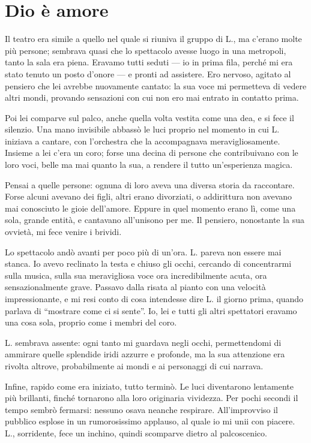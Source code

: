 \chapter{Dio è amore}
\label{ch:dio-e-amore}

Il teatro era simile a quello nel quale si riuniva il gruppo di L., ma c'erano molte più persone;
sembrava quasi che lo spettacolo avesse luogo in una metropoli, tanto la sala era piena. Eravamo
tutti seduti --- io in prima fila, perché mi era stato tenuto un posto d'onore --- e pronti ad
assistere. Ero nervoso, agitato al pensiero che lei avrebbe nuovamente cantato: la sua voce mi
permetteva di vedere altri mondi, provando sensazioni con cui non ero mai entrato in contatto prima.

Poi lei comparve sul palco, anche quella volta vestita come una dea, e si fece il silenzio. Una mano
invisibile abbassò le luci proprio nel momento in cui L. iniziava a cantare, con l'orchestra che la
accompagnava meravigliosamente. Insieme a lei c'era un coro; forse una decina di persone che
contribuivano con le loro voci, belle ma mai quanto la sua, a rendere il tutto un'esperienza magica.

Pensai a quelle persone: ognuna di loro aveva una diversa storia da raccontare. Forse alcuni avevano
dei figli, altri erano divorziati, o addirittura non avevano mai conosciuto le gioie dell'amore.
Eppure in quel momento erano lì, come una sola, grande entità, e cantavano all'unisono per me. Il
pensiero, nonostante la sua ovvietà, mi fece venire i brividi.

Lo spettacolo andò avanti per poco più di un'ora. L. pareva non essere mai stanca. Io avevo
reclinato la testa e chiuso gli occhi, cercando di concentrarmi sulla musica, sulla sua meravigliosa
voce ora incredibilmente acuta, ora sensazionalmente grave. Passavo dalla risata al pianto con una
velocità impressionante, e mi resi conto di cosa intendesse dire L. il giorno prima, quando parlava
di ``mostrare come ci si sente''. Io, lei e tutti gli altri spettatori eravamo una cosa sola,
proprio come i membri del coro.

L. sembrava assente: ogni tanto mi guardava negli occhi, permettendomi di ammirare quelle splendide
iridi azzurre e profonde, ma la sua attenzione era rivolta altrove, probabilmente ai mondi e ai
personaggi di cui narrava.

Infine, rapido come era iniziato, tutto terminò. Le luci diventarono lentamente più brillanti,
finché tornarono alla loro originaria vividezza. Per pochi secondi il tempo sembrò fermarsi: nessuno
osava neanche respirare. All'improvviso il pubblico esplose in un rumorosissimo applauso, al quale
io mi unii con piacere. L., sorridente, fece un inchino, quindi scomparve dietro al palcoscenico.

